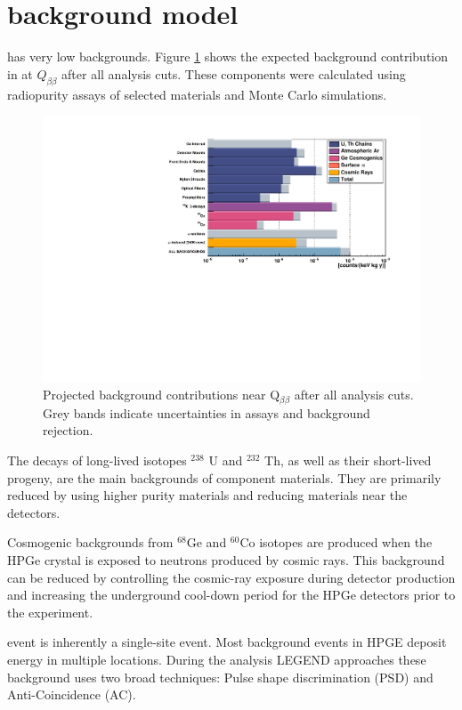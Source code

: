 \section{{\Ltwo} background model}

{\Ltwo} has very low backgrounds. Figure \ref{fig:L200_background} shows the expected background contribution in {\Ltwo} at $Q_{\beta \beta}$ after all analysis cuts. These components were calculated using radiopurity assays of selected materials and Monte Carlo simulations. 

\begin{figure}[!htb]
\centering
  \includegraphics[width=0.99\linewidth]{ch2/figs/L200_background.pdf}
  \caption{{\Ltwo} Projected background contributions near Q$_{\beta\beta}$ after all analysis cuts. Grey bands indicate uncertainties in assays and background rejection.}
\label{fig:L200_background}
  \end{figure}

The decays of long-lived isotopes $^{238}$ U and $^{232}$ Th, as well as their short-lived progeny, are the main backgrounds of component materials. They are primarily reduced by using higher purity materials and reducing materials near the detectors. 

Cosmogenic backgrounds from $^{68}$Ge and $^{60}$Co isotopes are produced when the HPGe crystal is exposed to neutrons produced by cosmic rays. This background can be reduced by controlling the cosmic-ray exposure during detector production and increasing the underground cool-down period for the HPGe detectors prior to the experiment.

{\onbb} event is inherently a single-site event. Most background events in HPGE deposit energy in multiple locations. During the analysis LEGEND approaches these background uses two broad techniques: Pulse shape discrimination (PSD) and Anti-Coincidence (AC).

